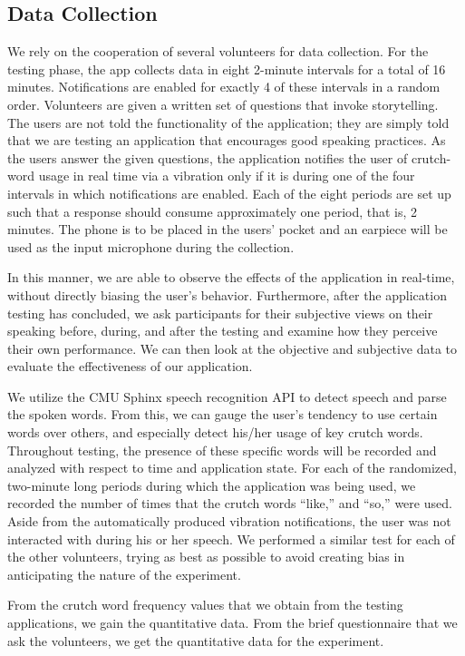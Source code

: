 \documentclass{sigchi}
\begin{document}
\subsection{Data Collection}

We rely on the cooperation of several volunteers for data collection. For the testing phase, the app collects data in eight 2-minute intervals for a total of 16 minutes. Notifications are enabled for exactly 4 of these intervals in a random order. Volunteers are given a written set of questions that invoke storytelling. The users are not told the functionality of the application; they are simply told that we are testing an application that encourages good speaking practices. As the users answer the given questions, the application notifies the user of crutch-word usage in real time via a vibration only if it is during one of the four intervals in which notifications are enabled. Each of the eight periods are set up such that a response should consume approximately one period, that is, 2 minutes. The phone is to be placed in the users’ pocket and an earpiece will be used as the input microphone during the collection.

In this manner, we are able to observe the effects of the application in real-time, without directly biasing the user’s behavior. Furthermore, after the application testing has concluded, we ask participants for their subjective views on their speaking before, during, and after the testing and examine how they perceive their own performance. We can then look at the objective and subjective data to evaluate the effectiveness of our application.

We utilize the CMU Sphinx speech recognition API to detect speech and parse the spoken words. From this, we can gauge the user’s tendency to use certain words over others, and especially detect his/her usage of key crutch words. Throughout testing, the presence of these specific words will be recorded and analyzed with respect to time and application state.  For each of the randomized, two-minute long periods during which the application was being used, we recorded the number of times that the crutch words “like,” and “so,” were used. Aside from the automatically produced vibration notifications, the user was not interacted with during his or her speech. We performed a similar test for each of the other volunteers, trying as best as possible to avoid creating bias in anticipating the nature of the experiment.

From the crutch word frequency values that we obtain from the testing applications, we gain the quantitative data. From the brief questionnaire that we ask the volunteers, we get the quantitative data for the experiment. 
\end{document}
